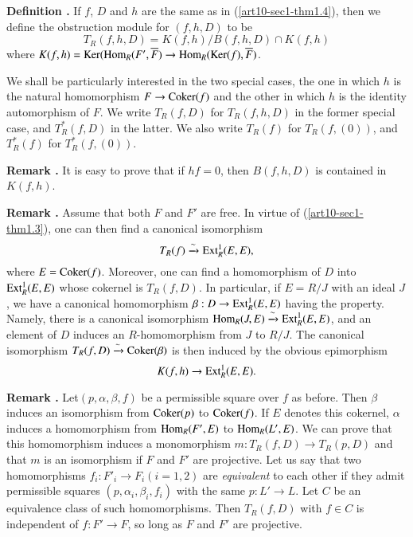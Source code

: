 \medskip
\noindent
{\bf Definition .\label{art10-sec1-defi1.5}}
If $f$, $D$ and $h$ are the same as in (\ref{art10-sec1-thm1.4}), then we define the obstruction module for $(f,h,D)$ to be
$$
T_{R}(f,h,D)=K(f,h)/B(f,h,D)\cap K(f,h)
$$
where $K(f,h)=\operatorname{\mathrm{Ker}}(\operatorname{\mathrm{Hom}}_{R}(F',\overline{F})\to \operatorname{\mathrm{Hom}}_{R}(\operatorname{\mathrm{Ker}}(f),\overline{F})$.
\smallskip

We shall be particularly interested in the two special cases, the one in which $h$ is the natural homomorphism $F\to \operatorname{\mathrm{Coker}} (f)$ and the other in which $h$ is the identity automorphism of $F$. We write $T_{R}(f,D)$ for $T_{R}(f,h,D)$ in the former special case, and $T^{*}_{R}(f,D)$ in the latter. We also write $T_{R}(f)$ for $T_{R}(f,(0))$, and $T^{*}_{R}(f)$ for $T^{*}_{R}(f,(0))$.

\medskip
\noindent
{\bf Remark .\label{art10-sec1-rem1.5.1}}
It is easy to prove that if $hf=0$, then $B(f,h,D)$ is contained in $K(f,h)$.

\medskip
\noindent
{\bf Remark .\label{art10-sec1-rem1.5.2}}
Assume that both $F$ and $F'$ are free. In virtue of (\ref{art10-sec1-thm1.3}), one can then find a canonical isomorphism
$$
T_{R}(f)\xrightarrow{\sim}\operatorname{\mathrm{Ext}}^{1}_{R}(E,E),
$$
where $E=\operatorname{\mathrm{Coker}} (f)$. Moreover, one can find a homomorphism of $D$ into $\operatorname{\mathrm{Ext}}^{1}_{R}(E,E)$ whose cokernel is $T_{R}(f,D)$. In particular, if $E=R/J$ with an ideal $J$, we have a canonical homomorphism $\beta:D\to \operatorname{\mathrm{Ext}}^{1}_{R}(E,E)$ having the property. Namely, there is a canonical isomorphism $\operatorname{\mathrm{Hom}}_{R}(J,E)\xrightarrow{\sim}\operatorname{\mathrm{Ext}}^{1}_{R}(E,E)$, and an element of $D$ induces an $R$-homomorphism from $J$ to $R/J$. The canonical isomorphism $T_{R}(f,D)\xrightarrow{\sim}\operatorname{\mathrm{Coker}} (\beta)$ is then induced by the obvious epimorphism 
$$
K(f,h)\to \operatorname{\mathrm{Ext}}^{1}_{R}(E,E).
$$

\medskip
\noindent
{\bf Remark .\label{art10-sec1-rem1.5.3}}
Let\pageoriginale $(p,\alpha,\beta,f)$ be a permissible square over $f$ as before. Then $\beta$ induces an isomorphism from $\operatorname{\mathrm{Coker}} (p)$ to $\operatorname{\mathrm{Coker}}(f)$. If $E$ denotes this cokernel, $\alpha$ induces a homomorphism from $\operatorname{\mathrm{Hom}}_{R}(F',E)$ to $\operatorname{\mathrm{Hom}}_{R}(L',E)$. We can prove that this homomorphism induces a mono\-morphism $m:T_{R}(f,D)\to T_{R}(p,D)$ and that $m$ is an isomorphism if $F$ and $F'$ are projective. Let us say that two homomorphisms $f_{i}:F'_{i}\to F_{i}(i=1,2)$ are {\em equivalent} to each other if they admit permissible squares $(p,\alpha_{i},\beta_{i},f_{i})$ with the same $p:L'\to L$. Let $C$ be an equivalence class of such homomorphisms. Then $T_{R}(f,D)$ with $f\in C$ is independent of $f:F'\to F$, so long as $F$ and $F'$ are projective.

